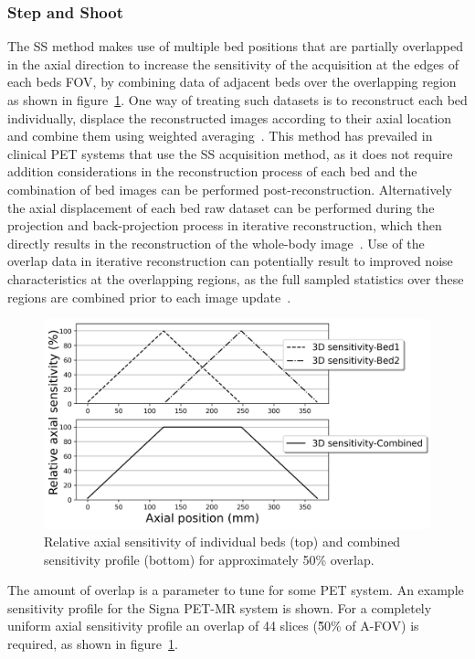 \subsubsection{Step and Shoot}
The SS method makes use of multiple bed positions that are partially overlapped in the axial direction to increase the sensitivity of the acquisition at the edges of each beds FOV, by combining data of adjacent beds over the overlapping region as shown in figure~\ref{fig3_1:fullOverlap}. One way of treating such datasets is to reconstruct each bed individually, displace the reconstructed images according to their axial location and combine them using weighted averaging~\cite{Schubert1996}. This method has prevailed in clinical PET systems that use the SS acquisition method, as it does not require addition considerations in the reconstruction process of each bed and the combination of bed images can be performed post-reconstruction. Alternatively the axial displacement of each bed raw dataset can be performed during the projection and back-projection process in iterative reconstruction, which then directly results in the reconstruction of the whole-body image~\cite{Ross2004}. Use of the overlap data in iterative reconstruction can potentially result to improved noise characteristics at the overlapping regions, as the full sampled statistics over these regions are combined prior to each image update~\cite{Ross2004,Stute2014}. 
%
\begin{figure} [ht!]
\centering
\includegraphics[scale=0.5,angle=0]{3_Results/3_1_DWB_Optimization/figures/SensitivityProfiles_fullOverlap.png}
\caption{Relative axial sensitivity of individual beds (top) and combined sensitivity profile (bottom) for approximately 50\% overlap.} 
\label{fig3_1:fullOverlap}
\end{figure}
%
The amount of overlap is a parameter to tune for some PET system. An example sensitivity profile for the Signa PET-MR system is shown. For a completely uniform axial sensitivity profile an overlap of 44 slices (\~50\% of A-FOV) is required, as shown in figure~\ref{fig3_1:fullOverlap}.
